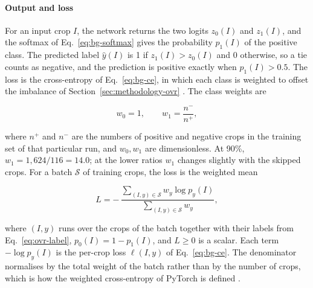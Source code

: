\paragraph{Output and loss}
For an input crop $I$, the network returns the two logits $z_0(I)$ and $z_1(I)$, and the
softmax of Eq.~\eqref{eq:bg-softmax} gives the probability $p_1(I)$ of the positive
class. The predicted label $\hat{y}(I)$ is 1 if $z_1(I) > z_0(I)$ and 0 otherwise, so a
tie counts as negative, and the prediction is positive exactly when $p_1(I) > 0.5$. The
loss is the cross-entropy of Eq.~\eqref{eq:bg-ce}, in which each class is weighted to
offset the imbalance of Section~\ref{sec:methodology-ovr} \citep{johnson2019survey}.
The class weights are

\begin{equation}
w_0 = 1, \qquad w_1 = \frac{n^-}{n^+},
\label{eq:class-weight}
\end{equation}

where $n^+$ and $n^-$ are the numbers of positive and negative crops in the training
set of that particular run, and $w_0, w_1$ are dimensionless. At 90\%,
$w_1 = 1{,}624/116 = 14.0$; at the lower ratios $w_1$ changes slightly with the skipped
crops. For a batch $\mathcal{S}$ of training crops, the loss is the weighted mean

\begin{equation}
L = -\,\frac{\sum_{(I, y) \in \mathcal{S}} w_{y} \log p_{y}(I)}
           {\sum_{(I, y) \in \mathcal{S}} w_{y}},
\label{eq:weighted-ce}
\end{equation}

where $(I, y)$ runs over the crops of the batch together with their labels from
Eq.~\eqref{eq:ovr-label}, $p_0(I) = 1 - p_1(I)$, and $L \ge 0$ is a scalar. Each
term $-\log p_{y}(I)$ is the per-crop loss $\ell(I, y)$ of
Eq.~\eqref{eq:bg-ce}. The denominator normalises by the total weight of the batch
rather than by the number of crops, which is how the weighted cross-entropy of PyTorch
is defined \citep{pytorch2025crossentropy}.

